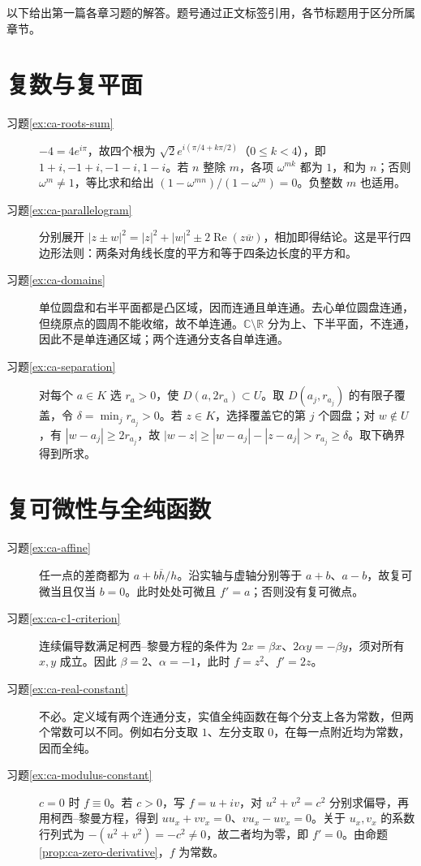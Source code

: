 \documentclass[UTF8,12pt,a4paper,fontset=fandol]{ctexbook}
\begin{document}
以下给出第一篇各章习题的解答。题号通过正文标签引用，各节标题用于区分所属章节。

\section{复数与复平面}
\begin{description}
 \item[习题\ref{ex:ca-roots-sum}]
 $-4=4e^{i\pi}$，故四个根为 $\sqrt2e^{i(\pi/4+k\pi/2)}$（$0\le k<4$），即 $1+i,-1+i,-1-i,1-i$。若 $n$ 整除 $m$，各项 $\omega^{mk}$ 都为 $1$，和为 $n$；否则 $\omega^m\ne1$，等比求和给出 $(1-\omega^{mn})/(1-\omega^m)=0$。负整数 $m$ 也适用。
 \item[习题\ref{ex:ca-parallelogram}]
 分别展开 $|z\pm w|^2=|z|^2+|w|^2\pm2\operatorname{Re}(z\overline w)$，相加即得结论。这是平行四边形法则：两条对角线长度的平方和等于四条边长度的平方和。
 \item[习题\ref{ex:ca-domains}]
 单位圆盘和右半平面都是凸区域，因而连通且单连通。去心单位圆盘连通，但绕原点的圆周不能收缩，故不单连通。$\mathbb{C}\setminus\mathbb{R}$ 分为上、下半平面，不连通，因此不是单连通区域；两个连通分支各自单连通。
 \item[习题\ref{ex:ca-separation}]
 对每个 $a\in K$ 选 $r_a>0$，使 $D(a,2r_a)\subset U$。取 $D(a_j,r_{a_j})$ 的有限子覆盖，令 $\delta=\min_jr_{a_j}>0$。若 $z\in K$，选择覆盖它的第 $j$ 个圆盘；对 $w\notin U$，有 $|w-a_j|\ge2r_{a_j}$，故 $|w-z|\ge|w-a_j|-|z-a_j|>r_{a_j}\ge\delta$。取下确界得到所求。
\end{description}

\section{复可微性与全纯函数}
\begin{description}
 \item[习题\ref{ex:ca-affine}]
 任一点的差商都为 $a+b\overline h/h$。沿实轴与虚轴分别等于 $a+b$、$a-b$，故复可微当且仅当 $b=0$。此时处处可微且 $f'=a$；否则没有复可微点。
 \item[习题\ref{ex:ca-c1-criterion}]
 连续偏导数满足柯西--黎曼方程的条件为 $2x=\beta x$、$2\alpha y=-\beta y$，须对所有 $x,y$ 成立。因此 $\beta=2$、$\alpha=-1$，此时 $f=z^2$、$f'=2z$。
 \item[习题\ref{ex:ca-real-constant}]
 不必。定义域有两个连通分支，实值全纯函数在每个分支上各为常数，但两个常数可以不同。例如右分支取 $1$、左分支取 $0$，在每一点附近均为常数，因而全纯。
 \item[习题\ref{ex:ca-modulus-constant}]
 $c=0$ 时 $f\equiv0$。若 $c>0$，写 $f=u+iv$，对 $u^2+v^2=c^2$ 分别求偏导，再用柯西--黎曼方程，得到 $u u_x+v v_x=0$、$v u_x-u v_x=0$。关于 $u_x,v_x$ 的系数行列式为 $-(u^2+v^2)=-c^2\ne0$，故二者均为零，即 $f'=0$。由命题\ref{prop:ca-zero-derivative}，$f$ 为常数。
\end{description}
\end{document}
